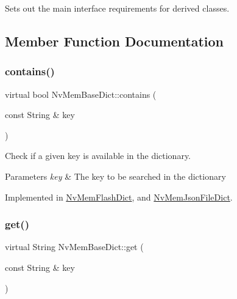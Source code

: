 Sets out the main interface requirements for derived classes. 

\subsection{Member Function Documentation}
\mbox{\label{class_nv_mem_base_dict_a755616173e4c94cf2a3cd227c38660d1}} 
\subsubsection{\texorpdfstring{contains()}{contains()}}
{\footnotesize\ttfamily virtual bool Nv\+Mem\+Base\+Dict\+::contains (\begin{DoxyParamCaption}\item[{const String \&}]{key }\end{DoxyParamCaption})\hspace{0.3cm}{\ttfamily [pure virtual]}}



Check if a given {\ttfamily key} is available in the dictionary. 


\begin{DoxyParams}{Parameters}
{\em key} & The key to be searched in the dictionary \\
\hline
\end{DoxyParams}


Implemented in \mbox{\hyperlink{class_nv_mem_flash_dict_aab2e9f6da1d6ba89df32c20b1746ea75}{Nv\+Mem\+Flash\+Dict}}, and \mbox{\hyperlink{class_nv_mem_json_file_dict_af7e546ec407e5e07425b938a04ab8b6a}{Nv\+Mem\+Json\+File\+Dict}}.

\mbox{\label{class_nv_mem_base_dict_a876f70d76462b15bfc23cab438077d17}} 
\subsubsection{\texorpdfstring{get()}{get()}}
{\footnotesize\ttfamily virtual String Nv\+Mem\+Base\+Dict\+::get (\begin{DoxyParamCaption}\item[{const String \&}]{key }\end{DoxyParamCaption})\hspace{0.3cm}{\ttfamily [pure virtual]}}



